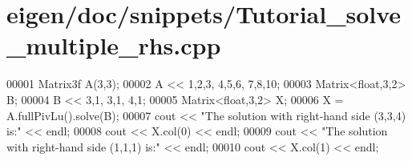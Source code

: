 \hypertarget{eigen_2doc_2snippets_2_tutorial__solve__multiple__rhs_8cpp_source}{}\section{eigen/doc/snippets/\+Tutorial\+\_\+solve\+\_\+multiple\+\_\+rhs.cpp}
\label{eigen_2doc_2snippets_2_tutorial__solve__multiple__rhs_8cpp_source}

\begin{DoxyCode}
00001 Matrix3f A(3,3);
00002 A << 1,2,3,  4,5,6,  7,8,10;
00003 Matrix<float,3,2> B;
00004 B << 3,1, 3,1, 4,1;
00005 Matrix<float,3,2> X;
00006 X = A.fullPivLu().solve(B);
00007 cout << \textcolor{stringliteral}{"The solution with right-hand side (3,3,4) is:"} << endl;
00008 cout << X.col(0) << endl;
00009 cout << \textcolor{stringliteral}{"The solution with right-hand side (1,1,1) is:"} << endl;
00010 cout << X.col(1) << endl;
\end{DoxyCode}
